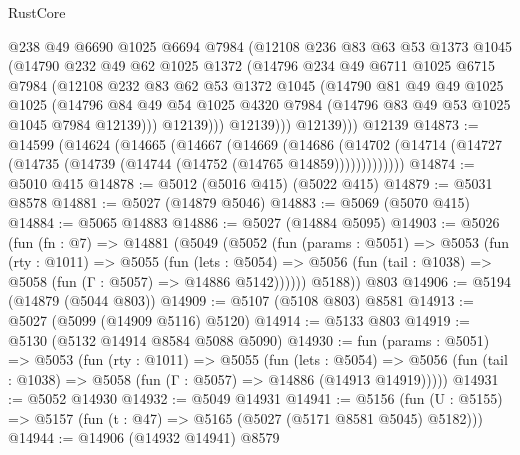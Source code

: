 \begin{lexlean}{RustCore}
\begin{coremodule}
              @238
              @49
              @6690
              @1025
              @6694
              @7984
              (@12108
                @236
                @83
                @63
                @53
                @1373
                @1045
                (@14790
                  @232
                  @49
                  @62
                  @1025
                  @1372
                  (@14796
                    @234
                    @49
                    @6711
                    @1025
                    @6715
                    @7984
                    (@12108
                      @232
                      @83
                      @62
                      @53
                      @1372
                      @1045
                      (@14790
                        @81
                        @49
                        @49
                        @1025
                        @1025
                        (@14796
                          @84
                          @49
                          @54
                          @1025
                          @4320
                          @7984
                          (@14796 @83 @49 @53 @1025 @1045 @7984 @12139)))
                      @12139)))
                @12139)))
          @12139)))
    @12139
@14873 := @14599
    (@14624
      (@14665
        (@14667
          (@14669
            (@14686
              (@14702 (@14714 (@14727 (@14735 (@14739 (@14744 (@14752 (@14765 @14859)))))))))))))
@14874 := @5010 @415
@14878 := @5012 (@5016 @415) (@5022 @415)
@14879 := @5031 @8578
@14881 := @5027 (@14879 @5046)
@14883 := @5069 (@5070 @415)
@14884 := @5065 @14883
@14886 := @5027 (@14884 @5095)
@14903 := @5026
    (fun (fn : @7) =>
    @14881
      (@5049
        (@5052
          (fun (params : @5051) =>
          @5053
            (fun (rty : @1011) =>
            @5055
              (fun (lets : @5054) =>
              @5056 (fun (tail : @1038) => @5058 (fun (Γ : @5057) => @14886 @5142))))))
        @5188))
    @803
@14906 := @5194 (@14879 (@5044 @803))
@14909 := @5107 (@5108 @803) @8581
@14913 := @5027 (@5099 (@14909 @5116) @5120)
@14914 := @5133 @803
@14919 := @5130 (@5132 @14914 @8584 @5088 @5090)
@14930 := fun (params : @5051) =>
  @5053
    (fun (rty : @1011) =>
    @5055
      (fun (lets : @5054) =>
      @5056 (fun (tail : @1038) => @5058 (fun (Γ : @5057) => @14886 (@14913 @14919)))))
@14931 := @5052 @14930
@14932 := @5049 @14931
@14941 := @5156
    (fun (U : @5155) => @5157 (fun (t : @47) => @5165 (@5027 (@5171 @8581 @5045) @5182)))
@14944 := @14906 (@14932 @14941) @8579

\end{coremodule}
\end{lexlean}
